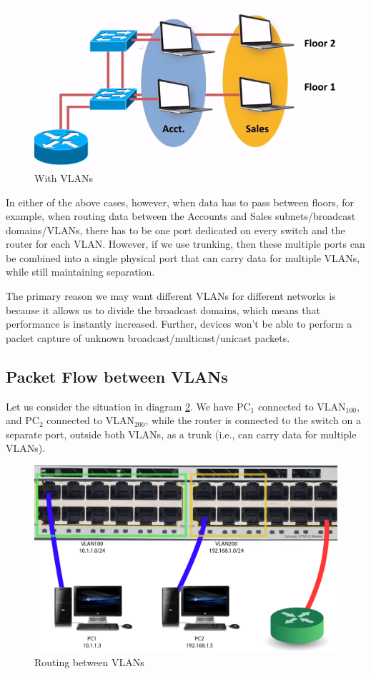 \begin{figure}[H]
	\centering
	\includegraphics[width=0.7\linewidth]{"ICND1/1. Switches/chapters/2.2.b With VLANs"}
	\caption{With VLANs}
	\label{fig:2.2.b}
\end{figure}

\noindent
In either of the above cases, however, when data has to pass between floors, for example, when routing data between the Accounts and Sales subnets/broadcast domains/VLANs, there has to be one port dedicated on every switch and the router for each VLAN. However, if we use trunking, then these multiple ports can be combined into a single physical port that can carry data for multiple VLANs, while still maintaining separation. 

The primary reason we may want different VLANs for different networks is because it allows us to divide the broadcast domains, which means that performance is instantly increased. Further, devices won't be able to perform a packet capture of unknown broadcast/multicast/unicast packets.

\subsection{Packet Flow between VLANs}
Let us consider the situation in diagram \ref{fig:2.2.c}. We have PC$_1$ connected to VLAN$_{100}$, and PC$_2$ connected to VLAN$_{200}$, while the router is connected to the switch on a separate port, outside both VLANs, as a trunk (i.e., can carry data for multiple VLANs). 

\begin{figure}[H]
	\centering
	\includegraphics[width=0.9\linewidth]{"ICND1/1. Switches/chapters/2.2.c Router on a stick"}
	\caption{Routing between VLANs}
	\label{fig:2.2.c}
\end{figure}

